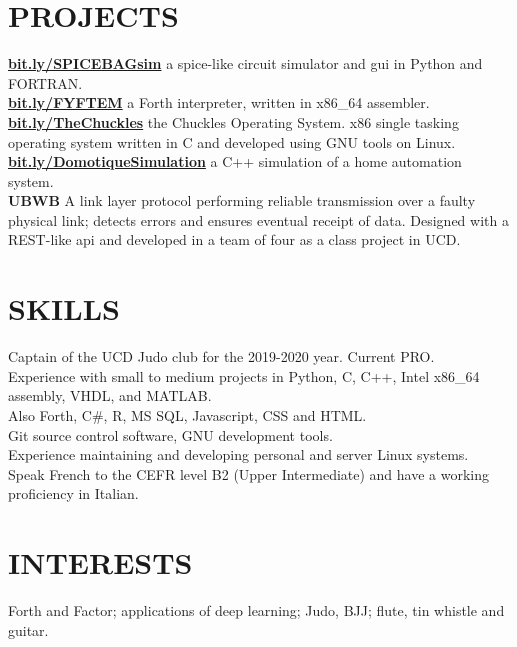 \documentclass[sectionsleft,centered,10pt]{res}
\let\oldhref\href
\renewcommand{\href}[2]{\oldhref{#1}{\textbf{#2}}}
\begin{document}
\begin{resume}
\section{PROJECTS}
\href{http://bit.ly/SPICEBAGsim}{ bit.ly/SPICEBAGsim} a spice-like circuit simulator and gui in Python and FORTRAN.\\
\href{http://bit.ly/FYFTEM}{ bit.ly/FYFTEM} a Forth interpreter, written in x86\_64 assembler.\\
\href{https://bit.ly/TheChuckles}{ bit.ly/TheChuckles} the Chuckles Operating System. x86 single tasking operating system written in C and developed using GNU tools on Linux.\\
\href{http://bit.ly/DomotiqueSimulation}{ bit.ly/DomotiqueSimulation} a C++ simulation of a home automation system.\\
\textbf{UBWB} A link layer protocol performing reliable transmission over a faulty physical link; detects errors and ensures eventual receipt of data. Designed with a REST-like api and developed in a team of four as a class project in UCD.\\

\section{SKILLS}
Captain of the UCD Judo club for the 2019-2020 year. Current PRO.\\
Experience with small to medium projects in Python, C, C++, Intel x86\_64 assembly, VHDL, and MATLAB.\\
Also Forth, C\#, R, MS SQL, Javascript, CSS and HTML.\\
Git source control software, GNU development tools.\\
Experience maintaining and developing personal and server Linux systems.\\
Speak French to the CEFR level B2 (Upper Intermediate) and have a working proficiency in Italian.
\section{INTERESTS}
Forth and Factor; applications of deep learning; Judo, BJJ; flute, tin whistle and guitar.


\end{resume}
\end{document}
